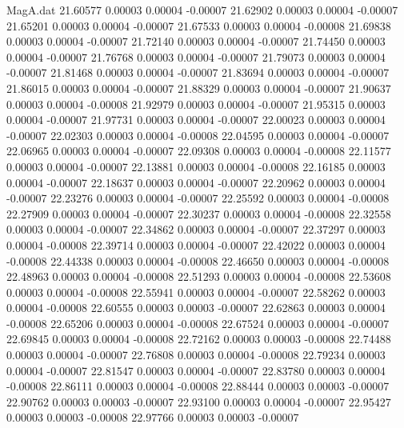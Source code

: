 \begin{filecontents}{MagA.dat}
  21.60577    0.00003    0.00004   -0.00007
  21.62902    0.00003    0.00004   -0.00007
  21.65201    0.00003    0.00004   -0.00007
  21.67533    0.00003    0.00004   -0.00008
  21.69838    0.00003    0.00004   -0.00007
  21.72140    0.00003    0.00004   -0.00007
  21.74450    0.00003    0.00004   -0.00007
  21.76768    0.00003    0.00004   -0.00007
  21.79073    0.00003    0.00004   -0.00007
  21.81468    0.00003    0.00004   -0.00007
  21.83694    0.00003    0.00004   -0.00007
  21.86015    0.00003    0.00004   -0.00007
  21.88329    0.00003    0.00004   -0.00007
  21.90637    0.00003    0.00004   -0.00008
  21.92979    0.00003    0.00004   -0.00007
  21.95315    0.00003    0.00004   -0.00007
  21.97731    0.00003    0.00004   -0.00007
  22.00023    0.00003    0.00004   -0.00007
  22.02303    0.00003    0.00004   -0.00008
  22.04595    0.00003    0.00004   -0.00007
  22.06965    0.00003    0.00004   -0.00007
  22.09308    0.00003    0.00004   -0.00008
  22.11577    0.00003    0.00004   -0.00007
  22.13881    0.00003    0.00004   -0.00008
  22.16185    0.00003    0.00004   -0.00007
  22.18637    0.00003    0.00004   -0.00007
  22.20962    0.00003    0.00004   -0.00007
  22.23276    0.00003    0.00004   -0.00007
  22.25592    0.00003    0.00004   -0.00008
  22.27909    0.00003    0.00004   -0.00007
  22.30237    0.00003    0.00004   -0.00008
  22.32558    0.00003    0.00004   -0.00007
  22.34862    0.00003    0.00004   -0.00007
  22.37297    0.00003    0.00004   -0.00008
  22.39714    0.00003    0.00004   -0.00007
  22.42022    0.00003    0.00004   -0.00008
  22.44338    0.00003    0.00004   -0.00008
  22.46650    0.00003    0.00004   -0.00008
  22.48963    0.00003    0.00004   -0.00008
  22.51293    0.00003    0.00004   -0.00008
  22.53608    0.00003    0.00004   -0.00008
  22.55941    0.00003    0.00004   -0.00007
  22.58262    0.00003    0.00004   -0.00008
  22.60555    0.00003    0.00003   -0.00007
  22.62863    0.00003    0.00004   -0.00008
  22.65206    0.00003    0.00004   -0.00008
  22.67524    0.00003    0.00004   -0.00007
  22.69845    0.00003    0.00004   -0.00008
  22.72162    0.00003    0.00003   -0.00008
  22.74488    0.00003    0.00004   -0.00007
  22.76808    0.00003    0.00004   -0.00008
  22.79234    0.00003    0.00004   -0.00007
  22.81547    0.00003    0.00004   -0.00007
  22.83780    0.00003    0.00004   -0.00008
  22.86111    0.00003    0.00004   -0.00008
  22.88444    0.00003    0.00003   -0.00007
  22.90762    0.00003    0.00003   -0.00007
  22.93100    0.00003    0.00004   -0.00007
  22.95427    0.00003    0.00003   -0.00008
  22.97766    0.00003    0.00003   -0.00007

\end{filecontents}

